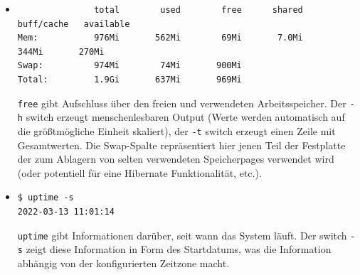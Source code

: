 \documentclass{article}
\begin{document}
\begin{itemize}
        \item \begin{verbatim}
               total        used        free      shared  buff/cache   available
Mem:           976Mi       562Mi        69Mi       7.0Mi       344Mi       270Mi
Swap:          974Mi        74Mi       900Mi
Total:         1.9Gi       637Mi       969Mi
        \end{verbatim}
        
        \texttt{free} gibt Aufschluss über den freien und verwendeten Arbeitsspeicher. Der \texttt{-h} switch erzeugt menschenlesbaren Output (Werte werden automatisch auf die größtmögliche Einheit skaliert), der \texttt{-t} switch erzeugt einen Zeile mit Gesamtwerten. Die Swap-Spalte repräsentiert hier jenen Teil der Festplatte der zum Ablagern von selten verwendeten Speicherpages verwendet wird (oder potentiell für eine Hibernate Funktionalität, etc.).

        \item \begin{verbatim}
$ uptime -s
2022-03-13 11:01:14
        \end{verbatim}

        \texttt{uptime} gibt Informationen darüber, seit wann das System läuft. Der switch \texttt{-s} zeigt diese Information in Form des Startdatums, was die Information abhängig von der konfigurierten Zeitzone macht.
\end{itemize}







\end{document}
